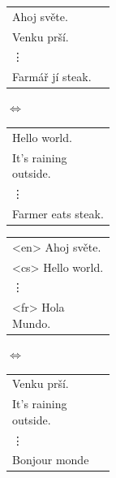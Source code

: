 \begin{figure}[H]
    \begin{center}
        \begin{tabular}{| >{\centering\arraybackslash}p{0.3\linewidth} |}
          \hline
          Ahoj světe. \\
          Venku prší. \\
          \hspace{1mm} \vdots \\
          Farmář jí steak. \\
          \hline
        \end{tabular}
        $\Longleftrightarrow$
        \begin{tabular}{| >{\centering\arraybackslash}p{0.3\linewidth} |}
          \hline
          Hello world. \\
          It's raining outside. \\
          \hspace{1mm} \vdots \\
          Farmer eats steak. \\
          \hline
        \end{tabular}
    \end{center}
    \begin{minipage}[t]{1\linewidth}
        \centering
        \label{subcap:singlePair}
    \end{minipage}%

    \begin{center}
        \begin{tabular}{| >{\centering\arraybackslash}p{0.3\linewidth} |}
          \hline
          <en> Ahoj světe. \\
          <cs> Hello world. \\
          \hspace{1mm} \vdots \\
          <fr> Hola Mundo. \\
          \hline
        \end{tabular}
        $\Longleftrightarrow$
        \begin{tabular}{| >{\centering\arraybackslash}p{0.3\linewidth} |}
          \hline
          Venku prší. \\
          It's raining outside. \\
          \hspace{1mm} \vdots \\
          Bonjour monde \\
          \hline
        \end{tabular}
    \end{center}
    \begin{minipage}[t]{1\linewidth}
        \centering
        \label{subcap:multiLingual}
    \end{minipage}%


\end{figure}
